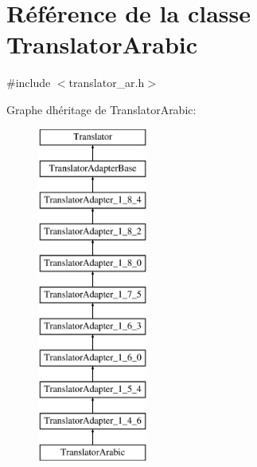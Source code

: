 \hypertarget{class_translator_arabic}{}\section{Référence de la classe Translator\+Arabic}
\label{class_translator_arabic}


{\ttfamily \#include $<$translator\+\_\+ar.\+h$>$}

Graphe d\textquotesingle{}héritage de Translator\+Arabic\+:\begin{figure}[H]
\begin{center}
\leavevmode
\includegraphics[height=11.000000cm]{class_translator_arabic}
\end{center}
\end{figure}
